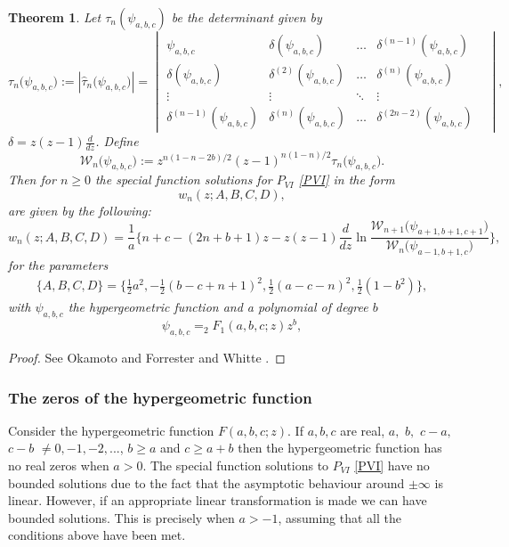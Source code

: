 \documentclass[12pt]{article}
\newtheorem{mydef}{Theorem}[section]
\numberwithin{figure}{section}
\numberwithin{equation}{section}
\numberwithin{table}{section}
\begin{document}
\begin{mydef}
Let $\tau_n(\psi_{a,b,c})$ be the determinant given by
\begin{equation}
\tau_n\big(\psi_{a,b,c}\big):=|\hat\tau_n\big(\psi_{a,b,c}\big)|=
\!\begin{vmatrix}
\psi_{a,b,c} & \delta(\psi_{a,b,c}) &\hdots& \delta^{(n-1)}(\psi_{a,b,c}) \\
\delta(\psi_{a,b,c}) & \delta^{(2)}(\psi_{a,b,c}) &\hdots& \delta^{(n)}(\psi_{a,b,c})  \\
\vdots &\vdots & \ddots & \vdots & \\
\delta^{(n-1)}(\psi_{a,b,c}) & \delta^{(n)}(\psi_{a,b,c}) &\hdots& \delta^{(2n-2)}(\psi_{a,b,c})
\end{vmatrix},\label{taup6}
\end{equation}
$\delta=z(z-1)\frac{d}{dz}$. Define
\begin{equation}
\mathcal{ W}_n\big(\psi_{a,b,c}\big):=z^{{n}(1-n-2b)/2}(z-1)^{n(1-n)/2}\tau_n\big(\psi_{a,b,c}\big).\label{taup6w}
\end{equation}
Then for $n\geq 0$ the special function solutions for $P_{VI}$ \eqref{PVI} in the form $$w_n(z;A,B,C,D),$$ are given by the following:
$$
w_n(z;A,B,C,D)=\frac{1}{a}\Bigg\{n+c-(2n+b+1)z-z(z-1)\frac{d}{dz}\ln\frac{\mathcal{ W}_{n+1}\big(\psi_{a+1,b+1,c+1}\big)}{\mathcal{ W}_{n}\big(\psi_{a-1,b+1,c}\big)}\Bigg\},
$$
for the parameters
\begin{align*}
\{A,B,C,D\}=\{\tfrac{1}{2}a^2,-\tfrac{1}{2}(b-c+n+1)^2,\tfrac{1}{2}(a-c-n)^2,\tfrac{1}{2}(1-b^2)\},
\end{align*}
with $\psi_{a,b,c}$ the hypergeometric function and a polynomial of degree $b$
$$\psi_{a,b,c}=_2\!\!F_1(a,b,c;z)z^b,$$
\end{mydef}
\begin{proof}
See Okamoto \cite{P:146:337} and Forrester and Whitte \cite{P:174:114}.
\end{proof}
\subsubsection{The zeros of the hypergeometric function}
Consider the hypergeometric function $F(a,b,c;z)$. If $a,b,c$ are real, $a,$ $b,$ $c-a,$ $c-b$ $\ne0,-1,-2,...$, $b\geq a$ and $c\geq a+b$ then the hypergeometric function has no real zeros when $a>0$.
The special function solutions to $P_{VI}$ \eqref{PVI} have no bounded solutions due to the fact that the asymptotic behaviour around $\pm\infty$ is linear. However, if an appropriate linear transformation is made we can have bounded solutions. This is precisely when $a>-1$, assuming that all the conditions above have been met.
\end{document}
